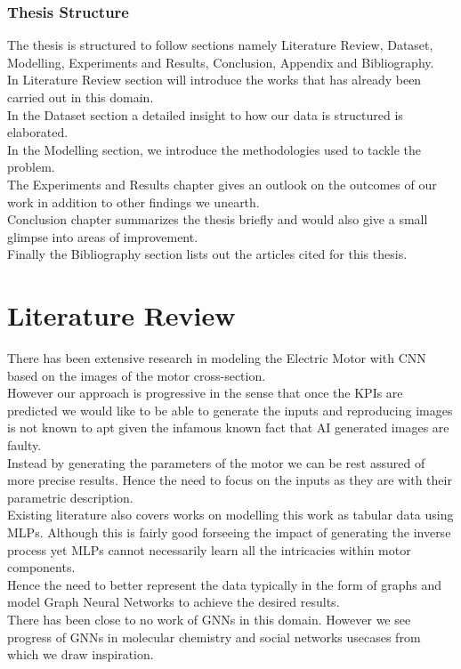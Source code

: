 \documentclass{report} %
\begin{document}
\subsection*{Thesis Structure}

The thesis is structured to follow sections namely Literature Review, Dataset, Modelling, Experiments and Results, Conclusion, Appendix and Bibliography.\\
In Literature Review section will introduce the works that has already been carried out in this domain. \\
In the Dataset section a detailed insight to how our data is structured is elaborated.\\
In the Modelling section, we introduce the methodologies used to tackle the problem. \\
The Experiments and Results chapter gives an outlook on the outcomes of our work in addition to other findings we unearth.\\ 
Conclusion chapter summarizes the thesis briefly and would also give a small glimpse into areas of improvement. \\
Finally the Bibliography section lists out the articles cited for this thesis.\\
\newpage 

\chapter*{Literature Review} 
There has been extensive research in modeling the Electric Motor with \ac{CNN} based on the images of the motor cross-section. \\
However our approach is progressive in the sense that once the \ac{KPI}s are predicted we would like to be able to generate the inputs and reproducing images is not known to apt given the infamous known fact that AI generated images are faulty.\\
Instead by generating the parameters of the motor we can be rest assured of more precise results. 
Hence the need to focus on the inputs as they are with their parametric description.\\
Existing literature also covers works on modelling this work as tabular data using \ac{MLP}s. 
Although this is fairly good forseeing the impact of generating the inverse process yet \ac{MLP}s cannot necessarily learn all the intricacies within motor components. \\
Hence the need to better represent the data typically in the form of graphs and model Graph Neural Networks to achieve the desired results. \\
There has been close to no work of \ac{GNN}s in this domain. However we see progress of \ac{GNN}s in molecular chemistry and social networks usecases from which we draw inspiration.\\
\end{document}
